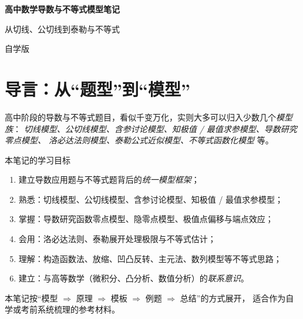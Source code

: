 \documentclass[a4paper,11pt]{ctexart}
\renewcommand{\notetitle}{高中数学导数与不等式模型笔记}
\renewcommand{\notesubtitle}{从切线、公切线到泰勒与不等式}
\renewcommand{\noteauthor}{自学版}
\begin{document}
\thispagestyle{empty}
\setcounter{page}{1}

\noindent
\begin{minipage}[t][0.7\textheight][c]{\textwidth}
  \raggedleft
  \vspace*{\fill}
  {\sffamily\bfseries\Huge\color{accent}\notetitle\par}
  \vspace{0.6em}
  {\Large\color{inkgray}\notesubtitle\par}
  \vspace{0.5em}
  {\large\color{inkgray}\noteauthor\par}
  \vspace{0.4em}
  \MathNoteVersionBlock
  \vspace*{\fill}
\end{minipage}

\clearpage
\thispagestyle{plain}
\tableofcontents
\newpage

\section{导言：从“题型”到“模型”}

高中阶段的导数与不等式题目，看似千变万化，实则大多可以归入少数几个\emph{模型族}：
\emph{切线模型、公切线模型、含参讨论模型、知极值 / 最值求参模型、导数研究零点模型、
洛必达法则模型、泰勒公式近似模型、不等式函数化模型} 等。

\begin{summarybox}{本笔记的学习目标}
  \begin{enumerate}
    \item 建立导数应用题与不等式题背后的\emph{统一模型框架}；
    \item 熟悉：切线模型、公切线模型、含参讨论模型、知极值 / 最值求参模型；
    \item 掌握：导数研究函数零点模型、隐零点模型、极值点偏移与端点效应；
    \item 会用：洛必达法则、泰勒展开处理极限与不等式估计；
    \item 理解：构造函数法、放缩、凹凸反转、主元法、数列模型等不等式思路；
    \item 建立：与高等数学（微积分、凸分析、数值分析）的\emph{联系意识}。
  \end{enumerate}
\end{summarybox}

本笔记按“模型 $\Rightarrow$ 原理 $\Rightarrow$ 模板 $\Rightarrow$ 例题 $\Rightarrow$ 总结”的方式展开，
适合作为自学或考前系统梳理的参考材料。
\end{document}
